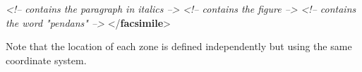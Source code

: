 \begin{shaded}
\hspace*{1em}\mbox{}\newline 
\textit{<!--  contains the paragraph in italics -->}\mbox{}\newline 
\hspace*{1em}\mbox{}\newline 
\textit{<!-- contains the figure -->}\mbox{}\newline 
\hspace*{1em}\mbox{}\newline 
\textit{<!-- contains the word "pendans" -->}\mbox{}\newline 
{}\mbox{}\newline 
{</\textbf{facsimile}>}\end{shaded}\egroup\par \noindent  Note that the location of each zone is defined independently but using the same coordinate system.\par
